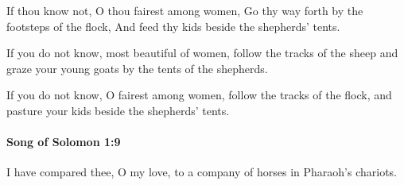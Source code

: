 			\begin{versebox}
					\item[BHS] 
					\item[LXX] 
					\item[ASV] If thou know not, O thou fairest among women, Go thy way forth by the footsteps of the flock, And feed thy kids beside the shepherds' tents.
					\item[NIV] If you do not know, most beautiful of women, follow the tracks of the sheep and graze your young goats by the tents of the shepherds.
					\item[NRSV] If you do not know, O fairest among women, follow the tracks of the flock, and pasture your kids beside the shepherds’ tents.
			\end{versebox}

		\paragraph{Song of Solomon 1:9} %
			\label{SONGOFSOLOMON-1-9}

			I have compared thee, O my love, to a company of horses in Pharaoh’s chariots.

